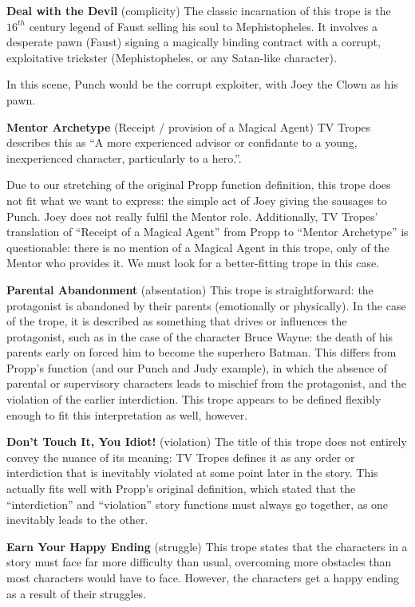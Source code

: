 \textbf{Deal with the Devil} (complicity)
The classic incarnation of this trope is the $16^{th}$ century legend of Faust
selling his soul to Mephistopheles. It involves a desperate pawn (Faust) signing
a magically binding contract with a corrupt, exploitative trickster
(Mephistopheles, or any Satan-like character).

In this scene, Punch would be the corrupt exploiter, with Joey the Clown as his pawn.

\textbf{Mentor Archetype} (Receipt / provision of a Magical Agent)
TV Tropes describes this as ``A more experienced advisor or confidante to a
young, inexperienced character, particularly to a hero.''.

Due to our stretching of the original Propp function definition, this trope does
not fit what we want to express: the simple act of Joey giving the sausages to
Punch. Joey does not really fulfil the Mentor role. Additionally, TV Tropes'
translation of ``Receipt of a Magical Agent'' from Propp to ``Mentor Archetype''
is questionable: there is no mention of a Magical Agent in this trope, only of
the Mentor who provides it. We must look for a better-fitting trope in this case.

\textbf{Parental Abandonment} (absentation)
This trope is straightforward: the protagonist is abandoned by their parents
(emotionally or physically). In the case of the trope, it is described as
something that drives or influences the protagonist, such as in the case of
the character Bruce Wayne: the death of his parents early on forced him to
become the superhero Batman. This differs from Propp's function (and our Punch
and Judy example), in which the absence of parental or supervisory characters
leads to mischief from the protagonist, and the violation of the earlier
interdiction. This trope appears to be defined flexibly enough to fit this
interpretation as well, however.

\textbf{Don't Touch It, You Idiot!} (violation)
The title of this trope does not entirely convey the nuance of its meaning: TV
Tropes defines it as any order or interdiction that is inevitably violated at
some point later in the story. This actually fits well with Propp's original
definition, which stated that the ``interdiction'' and ``violation'' story
functions must always go together, as one inevitably leads to the other.

\textbf{Earn Your Happy Ending} (struggle)
This trope states that the characters in a story must face far more difficulty
than usual, overcoming more obstacles than most characters would have to face.
However, the characters get a happy ending as a result of their struggles.


